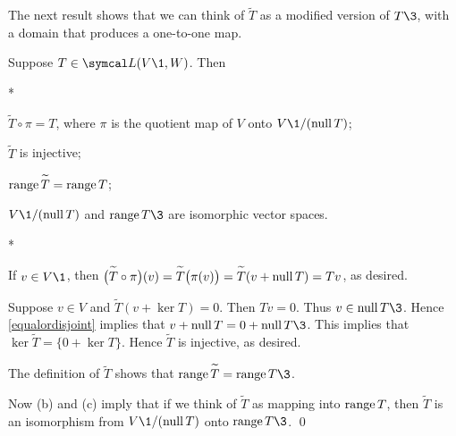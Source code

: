 The next result shows that we can think of $\tilde{T}$ as a modified version of $T\3$, with a domain that produces a one-to-one map.

{Suppose $T \in \L(V\1,W)$. Then
\begin{subtheorem}*
\item
$\tilde{T} \circ \pi = T$, where $\pi$ is the quotient map of $V$ onto $V\1/(\ker T)$;
\item
$\tilde{T}$ is injective;
\item
$\ran \tilde{T} = \ran T$;
\item
$V\1/(\ker T)$ and $\ran T\3$ are isomorphic vector spaces.
\end{subtheorem}}

\proof
\begin{subtheorem}*
\item
If $v \in V\1$, then $\paren[\big]{\tilde T \circ \pi}(v) = \tilde{T} \paren[\big]{\pi(v)} = \tilde{T}(v + \ker T) = Tv$, as desired.

\item
Suppose $v \in V$ and $\tilde{T}(v + \ker T) = 0$. Then $Tv = 0$. Thus $v \in \ker T\3$. Hence \ref{equalordisjoint} implies that $v + \ker T = 0 + \ker T\3$. This implies that $\ker \tilde{T} = \{0 + \ker T\}$. Hence $\tilde{T}$ is injective, as desired.

\item
The definition of $\tilde{T}$ shows that $\ran \tilde{T} = \ran T\3$.

\item
Now (b) and (c) imply that if we think of $\tilde{T}$ as mapping into $\operatorname{range} T$, then $\tilde{T}$ is an isomorphism from $V\1/(\ker T)$ onto $\ran T\3$. \qed
\end{subtheorem}

\pagebreak[3]

